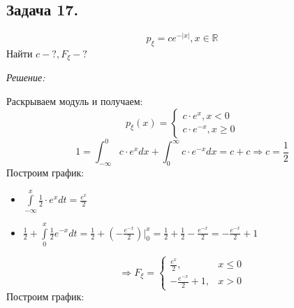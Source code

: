 \subsection*{Задача 17.}

\[ p_{\xi} = c e^{-|x|}, x \in \mathbb{R} \]
Найти $c - ?, F_{\xi} - ?$

\noindent \textit{Решение:}

Раскрываем модуль и получаем:
\[
p_{\xi}(x) =
\begin{cases}
	c \cdot e^x, x < 0 \\
	c \cdot e^{-x}, x \ge 0
\end{cases}
\]
\[
1 = \int_{-\infty}^{0} c \cdot e^x dx + \int_{0}^{\infty} c \cdot e^{-x} dx = c + c \Rightarrow c = \frac{1}{2}
\]
Построим график:
\begin{figure}[H]
\end{figure}
\begin{itemize}
	\item $\int\limits_{-\infty}^{x} \frac{1}{2} \cdot e^{x} dt = \frac{e^x}{2}$
	\item $\frac{1}{2} + \int\limits_{0}^{x} \frac{1}{2} e^{-x} dt = \frac{1}{2} + \left(-\frac{e^{-x}}{2}\right) \bigg|_{0}^x = \frac{1}{2} + \frac{1}{2} - \frac{e^{-x}}{2} = -\frac{e^{-x}}{2} + 1$
\end{itemize}
\[
\Rightarrow F_{\xi} =
\begin{cases}
	\frac{e^x}{2}, &x \le 0 \\
	-\frac{e^{-x}}{2} + 1, &x > 0
\end{cases}
\]
Построим график:
\begin{figure}[H]
\end{figure}

 